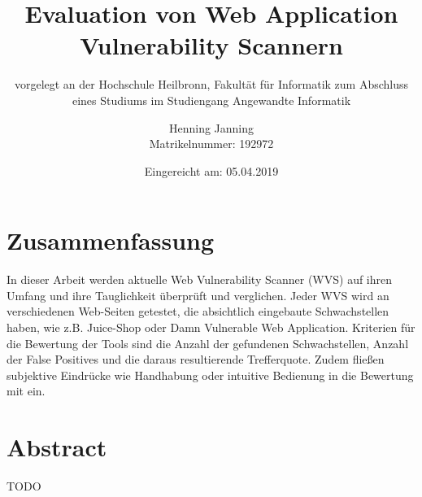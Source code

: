 \documentclass[12pt,oneside,a4paper,parskip]{scrbook}
\def\BaAuthor{Henning Janning}
\def\BaTitle{Evaluation von Web Application Vulnerability Scannern}
\def\BaSupervisorOne{Prof. Andreas Mayer}
\def\BaSupervisorTwo{Susanne Steuer (M.Sc.) }
\def\BaDeadline{05.04.2019}
\def\MatNr{192972}
\begin{document}


\frontmatter
\titlehead{%
  {Hochschule Heilbronn\\
   Fakultät für Informatik}}
\subject{Bachelorarbeit}
\title{\BaTitle\\[15mm]}
\subtitle{\normalsize{vorgelegt an der Hochschule Heilbronn, Fakultät für Informatik zum Abschluss eines Studiums im Studiengang Angewandte Informatik}}
\author{\BaAuthor\\
\normalsize{Matrikelnummer: \MatNr}}
\date{\normalsize{Eingereicht am: \BaDeadline}}
\publishers{
  \normalsize{Erstpr\"{u}fer: \BaSupervisorOne}\\
  \normalsize{Zweitpr\"{u}ferin: \BaSupervisorTwo}\\
}


\maketitle



\section*{Zusammenfassung}

In dieser Arbeit werden aktuelle Web Vulnerability Scanner (WVS) auf ihren Umfang und ihre Tauglichkeit überprüft und verglichen. Jeder WVS wird an verschiedenen Web-Seiten getestet, die absichtlich eingebaute Schwachstellen haben, wie z.B. Juice-Shop oder Damn Vulnerable Web Application. Kriterien für die Bewertung der Tools sind die Anzahl der gefundenen Schwachstellen, Anzahl der False Positives und die daraus resultierende Trefferquote. Zudem fließen subjektive Eindrücke wie Handhabung oder intuitive Bedienung in die Bewertung mit ein.

\section*{Abstract}
TODO


\setcounter{secnumdepth}{3}
\setcounter{tocdepth}{3}
\tableofcontents

\listoffigures
{}

\listoftables
{}
\end{document}

